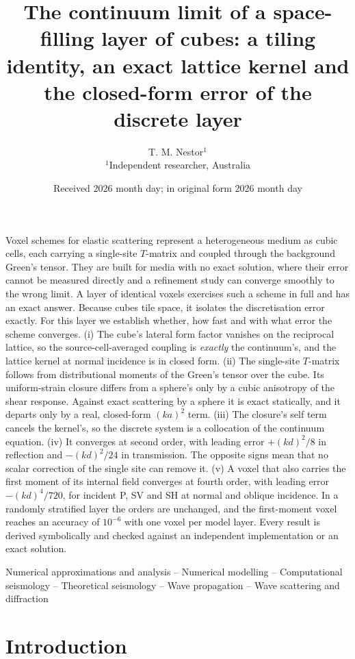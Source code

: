 \documentclass[extra,mreferee]{gji}
\title[Continuum limit of a layer of cubic voxels]{The continuum limit of a space-filling layer of
cubes: a tiling identity, an exact lattice kernel and the closed-form error of the discrete layer}
\author[T. M. Nestor]{T. M. Nestor$^{1}$\\
$^{1}$Independent researcher, Australia}
\date{Received 2026 month day; in original form 2026 month day}
\begin{document}
\label{firstpage}
\maketitle

\begin{summary}
Voxel schemes for elastic scattering represent a heterogeneous medium as cubic cells, each
carrying a single-site $T$-matrix and coupled through the background Green's tensor. They are
built for media with no exact solution, where their error cannot be measured directly and a
refinement study can converge smoothly to the wrong limit. A layer of identical voxels exercises
such a scheme in full and has an exact answer. Because cubes tile space, it isolates the
discretisation error exactly. For this layer we establish whether, how fast and with what error
the scheme converges. (i) The cube's lateral form factor vanishes on the reciprocal lattice, so
the source-cell-averaged coupling is \emph{exactly} the continuum's, and the lattice kernel at
normal incidence is in closed form. (ii) The single-site $T$-matrix follows from distributional
moments of the Green's tensor over the cube. Its uniform-strain closure differs from a sphere's
only by a cubic anisotropy of the shear response. Against exact scattering by a sphere it is exact
statically, and it departs only by a real, closed-form $(ka)^2$ term. (iii) The closure's self term
cancels the kernel's, so the discrete system is a collocation of the continuum equation. (iv) It
converges at second order, with leading error $+(kd)^2/8$ in reflection and $-(kd)^2/24$ in
transmission. The opposite signs mean that no scalar correction of the single site can remove it.
(v) A voxel that also carries the first moment of its internal field converges at fourth order,
with leading error $-(kd)^4/720$, for incident P, SV and SH at normal and oblique incidence. In a
randomly stratified layer the orders are unchanged, and the first-moment voxel reaches an accuracy
of $10^{-6}$ with one voxel per model layer. Every result is derived symbolically and checked
against an independent implementation or an exact solution.
\end{summary}

\begin{keywords}
Numerical approximations and analysis -- Numerical modelling -- Computational seismology --
Theoretical seismology -- Wave propagation -- Wave scattering and diffraction
\end{keywords}

\section{Introduction}\label{sec:intro}
\end{document}
